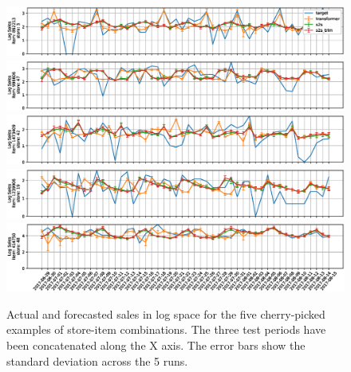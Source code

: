\documentclass{elsarticle}
\begin{document}
	
	
	\begin{figure}
		\centering
		\includegraphics[width=1\linewidth]{img/sample_0_log}
		\includegraphics[width=1\linewidth]{img/sample_1_log}
		\includegraphics[width=1\linewidth]{img/sample_2_log}
		\includegraphics[width=1\linewidth]{img/sample_3_log}
		\includegraphics[width=1\linewidth]{img/sample_4_log}
	\caption{Actual and forecasted sales in log space for the five cherry-picked examples of store-item combinations. The three test periods have been concatenated along the X axis. The error bars show the standard deviation across the 5 runs.}
		\label{fig:ts_log}
	\end{figure}
\end{document}

